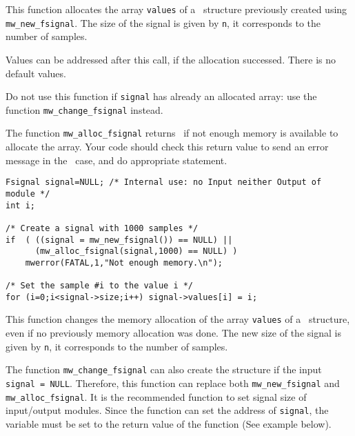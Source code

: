 \Description
This function allocates the array \verb+values+ of a \fsignal\ structure previously created using \verb+mw_new_fsignal+. The size of the signal is given by 
\verb+n+, it corresponds to the number of samples.

Values can be addressed after this call, if the allocation successed. There is
no default values.

Do not use this function if \verb+signal+ has already an allocated array: use
the function \verb+mw_change_fsignal+ instead.

The function \verb+mw_alloc_fsignal+ returns \Null\ if not enough memory is available to allocate the array. Your code should check this return value to 
send an error message in the \Null\ case, and do appropriate statement.

\Next
\Example
\begin{verbatim}
Fsignal signal=NULL; /* Internal use: no Input neither Output of module */
int i;

/* Create a signal with 1000 samples */
if  ( ((signal = mw_new_fsignal()) == NULL) ||
      (mw_alloc_fsignal(signal,1000) == NULL) )
    mwerror(FATAL,1,"Not enough memory.\n");

/* Set the sample #i to the value i */
for (i=0;i<signal->size;i++) signal->values[i] = i;
\end{verbatim}

\newpage %

\Description
This function changes the memory allocation of the array \verb+values+ of a \fsignal\ structure, even if no previously memory allocation was done.
The new size of the signal is given by \verb+n+, it corresponds to the number of samples.

The function \verb+mw_change_fsignal+ can also create the structure if the input \verb+signal = NULL+.
Therefore, this function can replace both \verb+mw_new_fsignal+ and
\verb+mw_alloc_fsignal+. It is the recommended function to set signal 
size of input/output modules. Since the function can set the 
address of \verb+signal+, the variable must be set to the return value of 
the function (See example below).

